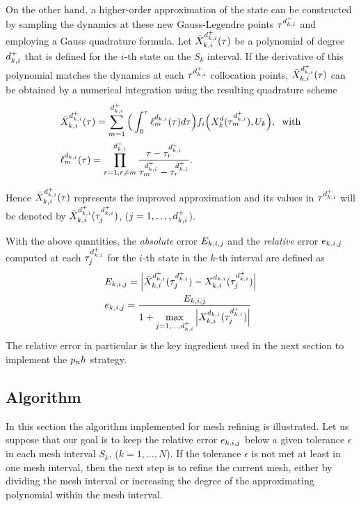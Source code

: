 On the other hand, a higher-order approximation of the state can be constructed by sampling the dynamics at these new Gauss-Legendre points $\tau^{{d}_{k,i}^{+}}$ and employing a Gauss quadrature formula.
Let $\bar{X}_{k,i}^{d_{k,i}^{+}} (\tau)$ be a polynomial of degree $d_{k,i}^{+}$ that is defined for the $i$-th state on the $S_k$ interval. If the derivative of this polynomial matches the dynamics at each $\tau^{{d}_{k,i}^{+}}$ collocation points, $\bar{X}_{k,i}^{d_{k,i}^{+}} (\tau)$ can be obtained by a numerical integration using the resulting quadrature scheme
\begin{subequations}
\begin{align}
	&\bar{X}_{k,i}^{d_{k,i}^{+}} (\tau) = \sum_{m=1}^{d_{k,i}^{+}}\Big(\int_{0}^{\tau}\ell_{m}^{d_{k,i}} (\tau)d\tau\Big) f_i\Big(X_{k}^{d}(\tau^{{d}_{k,i}^{+}}_m), U_k\Big), \hspace{2mm} \text{with} \label{eq:barX}\\
	&  \ell_{m}^{d_{k,i}} (\tau) = \prod_{r=1, r\neq m}^{d_{k,i}^{+}} \dfrac{\tau - \tau^{{d}_{k,i}^{+}}_r}{\tau^{{d}_{k,i}^{+}}_m - \tau^{{d}_{k,i}^{+}}_r}. \label{eq:meshlm}
\end{align}
\end{subequations}

Hence $\bar{X}_{k,i}^{d_{k,i}^{+}} (\tau)$ represents the improved approximation and its values in $\tau^{{d}_{k,i}^{+}}$ will be denoted by $\bar{X}_{k,i}^{d_{k,i}^{+}} (\tau^{{d}_{k,i}^{+}}_j)$, ($j = 1, \dots, d_{k,i}^{+}$).

With the above quantities, the \emph{absolute} error $E_{k,i,j}$ and the \emph{relative} error $e_{k,i,j}$ computed at each $\tau^{{d}_{k,i}^{+}}_j$ for the $i$-th state in the $k$-th interval are defined as
\begin{subequations}
	\begin{align}
	&E_{k,i,j} = \Big|\bar{X}_{k,i}^{d_{k,i}^{+}} (\tau^{{d}_{k,i}^{+}}_j) - X_{k,i}^{d_{k,i}} (\tau^{{d}_{k,i}^{+}}_j)\Big| \label{eq:absolute}\\
	&e_{k,i,j} = \dfrac{E_{k,i,j}}{1 + \max\limits_{j= 1, \dots, d_{k,i}^{+}} \Big| X_{k,i}^{d_{k,i}} (\tau^{{d}_{k,i}^{+}}_j)\Big|} \label{eq:relative}
	\end{align}
\end{subequations}
The relative error in particular is the key ingredient used  in the next section to implement the $p_{n}h$ strategy.

\subsection*{Algorithm}
In this section the algorithm implemented for mesh refining is illustrated.
Let us suppose that our goal is to keep the relative error $e_{k,i,j}$ below a given tolerance $\epsilon$ in each mesh interval $S_k$, ($k = 1, \dots, N$). If the tolerance $\epsilon$  is not met at least in one mesh interval, then the next step is to refine the current mesh, either by dividing the mesh interval or increasing the degree of the approximating polynomial within the mesh interval.

